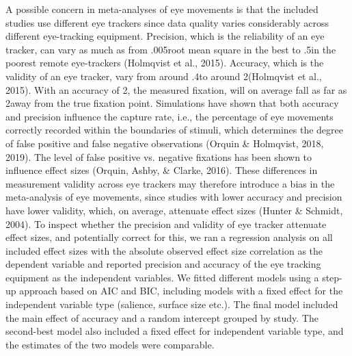 \documentclass{article}
\begin{document}
A possible concern in meta-analyses of eye movements is that the included studies use different eye trackers since data quality varies considerably across different eye-tracking equipment. Precision, which is the reliability of an eye tracker, can vary as much as from .005\degree root mean square in the best to .5\degree in the poorest remote eye-trackers (Holmqvist et al., 2015). Accuracy, which is the validity of an eye tracker, vary from around .4\degree to around 2\degree (Holmqvist et al., 2015). With an accuracy of 2\degree, the measured fixation, will on average fall as far as 2\degree away from the true fixation point. Simulations have shown that both accuracy and precision influence the capture rate, i.e., the percentage of eye movements correctly recorded within the boundaries of stimuli, which determines the degree of false positive and false negative observations (Orquin \& Holmqvist, 2018, 2019). The level of false positive vs. negative fixations has been shown to influence effect sizes (Orquin, Ashby, \& Clarke, 2016). These differences in measurement validity across eye trackers may therefore introduce a bias in the meta-analysis of eye movements, since studies with lower accuracy and precision have lower validity, which, on average, attenuate effect sizes (Hunter \& Schmidt, 2004). To inspect whether the precision and validity of eye tracker attenuate effect sizes, and potentially correct for this, we ran a regression analysis on all included effect sizes with the absolute observed effect size correlation as the dependent variable and reported precision and accuracy of the eye tracking equipment as the independent variables. We fitted different models using a step-up approach based on AIC and BIC, including models with a fixed effect for the independent variable type (salience, surface size etc.). The final model included the main effect of accuracy and a random intercept grouped by study. The second-best model also included a fixed effect for independent variable type, and the estimates of the two models were comparable.
\end{document}
